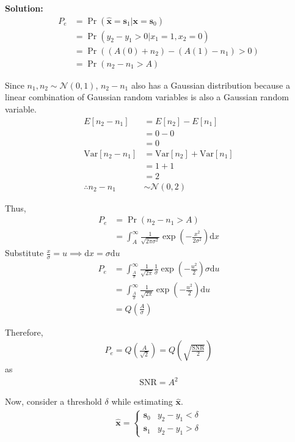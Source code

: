 \documentclass[journal,12pt,twocolumn]{IEEEtran}
\newcommand{\solution}{\noindent \textbf{Solution: }}
\providecommand{\pr}[1]{\ensuremath{\Pr\left(#1\right)}}
\providecommand{\brak}[1]{\ensuremath{\left(#1\right)}}
\providecommand{\mean}[1]{E\left[ #1 \right]}
\providecommand{\var}[1]{\mathrm{Var}\left[ #1 \right]}
\providecommand{\der}[1]{\mathrm{d} #1}
\providecommand{\gauss}[2]{\mathcal{N}\ensuremath{\left(#1,#2\right)}}
\let\vec\mathbf
\numberwithin{equation}{section}
\renewcommand\thesection{\arabic{section}}
\begin{document}
\begin{enumerate}[label=\thesection.\arabic*,ref=\thesection.\theenumi]
	\solution 
	\begin{align}
		P_e &= \pr{\hat{\vec{x}} = \vec{s}_1|\vec{x} = \vec{s}_0} \\
		&= \pr{y_2 - y_1 > 0 |x_1=1, x_2=0} \\
		&= \pr{(A(0) + n_2) - (A(1) - n_1) > 0} \\
		&= \pr{n_2 - n_1 > A}
	\end{align}
	
	Since $n_1, n_2 \sim \gauss{0}{1}$, $n_2 - n_1$ also has a Gaussian distribution because a linear combination of Gaussian random variables is also a Gaussian random variable. 
	\begin{align}
		\mean{n_2 - n_1} &= \mean{n_2} - \mean{n_1} \\
		&= 0 - 0 \\
		&= 0 \\
		\var{n_2 - n_1} &= \var{n_2}  + \var{n_1} \\
		&= 1 + 1 \\
		&= 2 \\
		\therefore n_2 - n_1 &\sim \gauss{0}{2}
	\end{align}
	
	Thus,
	\begin{align}
		P_e &= \pr{n_2 - n_1 > A} \\
		&= \int_A^{\infty} \frac{1}{\sqrt{2\pi\sigma^2}} \exp\brak{-\frac{x^2}{2\sigma^2}} \der{x}
	\end{align}
	Substitute $\frac{x}{\sigma} = u \implies \der{x} = \sigma \der{u}$
	\begin{align}
		P_e &= \int_{\frac{A}{\sigma}}^{\infty} \frac{1}{\sqrt{2\pi}} \frac{1}{\sigma}  \exp\brak{-\frac{u^2}{2}} \sigma \der{u} \\
		&= \int_{\frac{A}{\sigma}}^{\infty} \frac{1}{\sqrt{2\pi}} \exp\brak{-\frac{u^2}{2}} \der{u} \\
		&= Q\brak{\frac{A}{\sigma}}
	\end{align}
	
	Therefore,
	\begin{align}
		P_e = Q\brak{\frac{A}{\sqrt{2}}} = Q\brak{\sqrt{\frac{\text{SNR}}{2}}}
	\end{align}
	as 
	\begin{align}
		\text{SNR} = A^2
	\end{align}
	
	Now, consider a threshold $\delta$ while estimating $\hat{\vec{x}}$. 
	\begin{align}
		\hat{\vec{x}} = 
		\begin{cases}
			\vec{s}_0 & y_2 - y_1 < \delta \\
			\vec{s}_1 & y_2 - y_1 > \delta
		\end{cases}
	\end{align}
	

\end{enumerate}
\end{document}
